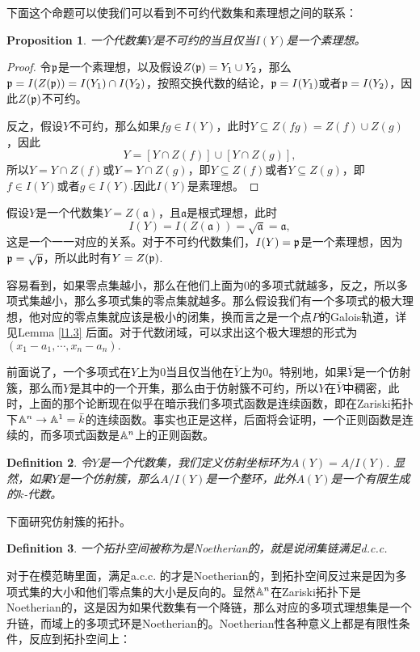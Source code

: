 \documentclass[9pt]{extarticle}
\theoremstyle{plain}%
\newtheorem{defi}{Definition}[section]%
\newtheorem{pro}[defi]{Proposition}%
\begin{document}
下面这个命题可以使我们可以看到不可约代数集和素理想之间的联系：

\begin{pro}
一个代数集$Y$是不可约的当且仅当$I(Y)$是一个素理想。
\label{p1.2}
\end{pro}
\begin{proof}
令$\mathfrak{p}$是一个素理想，以及假设$Z(\mathfrak{p})=Y_1\cup Y_2$，那么$\mathfrak{p}=I(Z(\mathfrak{p}))=I(Y_1)\cap I(Y_2)$，按照交换代数的结论，$\mathfrak{p}=I(Y_1)$或者$\mathfrak{p}=I(Y_2)$，因此$Z(\mathfrak{p})$不可约。

反之，假设$Y$不可约，那么如果$fg\in I(Y)$，此时$Y\subseteq Z(fg)=Z(f)\cup Z(g)$，因此
\[
	Y=[Y\cap Z(f)]\cup [Y\cap Z(g)],
\]
所以$Y=Y\cap Z(f)$或$Y=Y\cap Z(g)$，即$Y\subseteq Z(f)$或者$Y\subseteq Z(g)$，即$f\in I(Y)$或者$g\in I(Y)$.因此$I(Y)$是素理想。
\end{proof}

假设$Y$是一个代数集$Y=Z(\mathfrak{a})$，且$\mathfrak{a}$是根式理想，此时
\[
I(Y)=I(Z(\mathfrak{a}))=\sqrt{\mathfrak{a}}=\mathfrak{a},
\]
这是一个一一对应的关系。对于不可约代数集们，$I(Y)=\mathfrak{p}$是一个素理想，因为$\mathfrak{p}=\sqrt{\mathfrak{p}}$，所以此时有$Y=Z(\mathfrak{p})$.

容易看到，如果零点集越小，那么在他们上面为0的多项式就越多，反之，所以多项式集越小，那么多项式集的零点集就越多。那么假设我们有一个多项式的极大理想，他对应的零点集就应该是极小的闭集，换而言之是一个点$P$的Galois轨道，详见Lemma \ref{l1.3} 后面。对于代数闭域，可以求出这个极大理想的形式为$(x_1-a_1,\cdots,x_n-a_n).$

前面说了，一个多项式在$Y$上为$0$当且仅当他在$\bar{Y}$上为$0$。特别地，如果$\bar{Y}$是一个仿射簇，那么而$Y$是其中的一个开集，那么由于仿射簇不可约，所以$Y$在$\bar{Y}$中稠密，此时，上面的那个论断现在似乎在暗示我们多项式函数是连续函数，即在Zariski拓扑下$\mathbb{A}^n\to \mathbb{A}^1=\bar{k}$的连续函数。事实也正是这样，后面将会证明，一个正则函数是连续的，而多项式函数是$\mathbb{A}^n$上的正则函数。

\begin{defi}
令$Y$是一个代数集，我们定义仿射坐标环为$A(Y)=A/I(Y)$.
显然，如果$Y$是一个仿射簇，那么$A/I(Y)$是一个整环，此外$A(Y)$是一个有限生成的$k$-代数。
\end{defi}

下面研究仿射簇的拓扑。

\begin{defi}
	一个拓扑空间被称为是Noetherian的，就是说闭集链满足d.c.c.
\end{defi}
对于在模范畴里面，满足a.c.c.
的才是Noetherian的，到拓扑空间反过来是因为多项式集的大小和他们零点集的大小是反向的。显然$\mathbb{A}^n$在Zariski拓扑下是Noetherian的，这是因为如果代数集有一个降链，那么对应的多项式理想集是一个升链，而域上的多项式环是Noetherian的。Noetherian性各种意义上都是有限性条件，反应到拓扑空间上：
\end{document}
